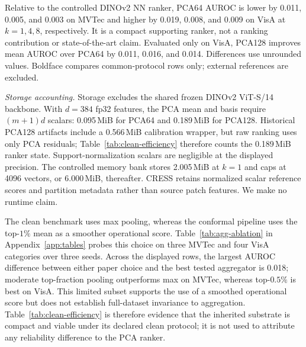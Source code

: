 Relative to the controlled DINOv2 NN ranker, PCA64 AUROC is lower by 0.011, 0.005, and 0.003 on MVTec and higher by 0.019, 0.008, and 0.009 on VisA at $k=1,4,8$, respectively. It is a compact supporting ranker, not a ranking contribution or state-of-the-art claim. Evaluated only on VisA, PCA128 improves mean AUROC over PCA64 by 0.011, 0.016, and 0.014. Differences use unrounded values. Boldface compares common-protocol rows only; external references are excluded.

\emph{Storage accounting.} Storage excludes the shared frozen DINOv2 ViT-S/14 backbone. With $d=384$ fp32 features, the PCA mean and basis require $(m+1)d$ scalars: 0.095\,MiB for PCA64 and 0.189\,MiB for PCA128. Historical PCA128 artifacts include a 0.566\,MiB calibration wrapper, but raw ranking uses only PCA residuals; Table~\ref{tab:clean-efficiency} therefore counts the 0.189\,MiB ranker state. Support-normalization scalars are negligible at the displayed precision. The controlled memory bank stores 2.005\,MiB at $k=1$ and caps at 4096 vectors, or 6.000\,MiB, thereafter. CRESS retains normalized scalar reference scores and partition metadata rather than source patch features. We make no runtime claim.

The clean benchmark uses max pooling, whereas the conformal pipeline uses the top-$1\%$ mean as a smoother operational score. Table~\ref{tab:agg-ablation} in Appendix~\ref{app:tables} probes this choice on three MVTec and four VisA categories over three seeds. Across the displayed rows, the largest AUROC difference between either paper choice and the best tested aggregator is 0.018; moderate top-fraction pooling outperforms max on MVTec, whereas top-$0.5\%$ is best on VisA. This limited subset supports the use of a smoothed operational score but does not establish full-dataset invariance to aggregation. Table~\ref{tab:clean-efficiency} is therefore evidence that the inherited substrate is compact and viable under its declared clean protocol; it is not used to attribute any reliability difference to the PCA ranker.
